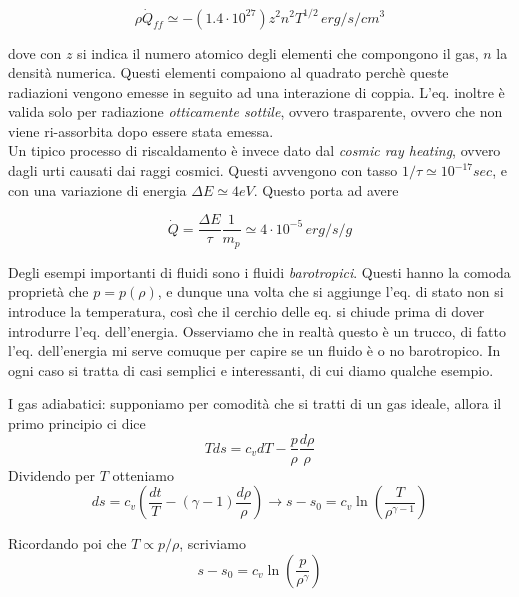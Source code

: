 \documentclass{report}
\begin{document}
\begin{equation}
    \rho \dot{Q}_{ff} \simeq -(1.4 \cdot 10^{27})z^2n^2 T^{1/2} \, erg/s/cm^3 
\end{equation}

dove con $z$ si indica il numero atomico degli elementi che compongono il gas, $n$ la densità numerica. Questi elementi compaiono al quadrato perchè queste radiazioni vengono emesse in seguito ad una interazione di coppia. L'eq. inoltre è valida solo per radiazione \emph{otticamente sottile}, ovvero trasparente, ovvero che non viene ri-assorbita dopo essere stata emessa. \\

Un tipico processo di riscaldamento è invece dato dal \emph{cosmic ray heating}, ovvero dagli urti causati dai raggi cosmici. Questi avvengono con tasso $1/\tau \simeq 10^{-17} sec$, e con una variazione di energia $\Delta E \simeq 4 eV$. Questo porta ad avere 

\begin{equation}
    \dot{Q} = \frac{\Delta E}{\tau}\frac{1}{m_p} \simeq 4\cdot 10^{-5} \, erg/s/g
\end{equation}

Degli esempi importanti di fluidi sono i fluidi \emph{barotropici}. Questi hanno la comoda proprietà che $p=p(\rho)$, e dunque una volta che si aggiunge l'eq. di stato non si introduce la temperatura, così che il cerchio delle eq. si chiude prima di dover introdurre l'eq. dell'energia. Osserviamo che in realtà questo è un trucco, di fatto l'eq. dell'energia mi serve comuque per capire se un fluido è o no barotropico. In ogni caso si tratta di casi semplici e interessanti, di cui diamo qualche esempio.

I gas adiabatici: supponiamo per comodità che si tratti di un gas ideale, allora il primo principio ci dice 
\begin{equation}
    Tds = c_vdT - \frac{p}{\rho}\frac{d\rho}{\rho}
\end{equation}
Dividendo per $T$ otteniamo 
\begin{equation}
    ds = c_v\left(\frac{dt}{T} - (\gamma-1)\frac{d\rho}{\rho}\right) \rightarrow s - s_0 = c_v\ln{\left(\frac{T}{\rho^{\gamma - 1}}\right)}
\end{equation}

Ricordando poi che $T \propto p/\rho$, scriviamo 
\begin{equation}
    s - s_0 = c_v\ln{\left(\frac{p}{\rho^{\gamma}}\right)}
\end{equation}
\end{document}
